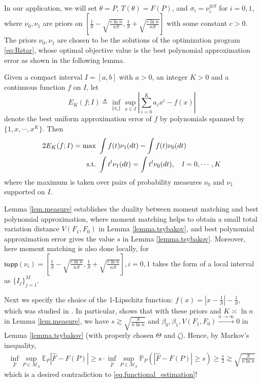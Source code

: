 \documentclass[final,12pt]{colt2018} %
\def \bP {\mathbb{P}}
\def \bE {\mathbb{E}}
\newcommand{\calM}{{\mathcal{M}}}
\begin{document}
In our application, we will set $\theta=P$, $T(\theta)=F(P)$, and $\sigma_i=\nu_i^{\otimes S}$ for $i=0,1$, where $\nu_0,\nu_1$ are priors on $[\frac{1}{S}-\sqrt{\frac{c\ln n}{nS}}, \frac{1}{S}+\sqrt{\frac{c\ln n}{nS}}]$ with some constant $c>0$. The priors $\nu_0,\nu_1$ are chosen to be the solutions of the optimization program \eqref{eq:Rstar}, whose optimal objective value is the best polynomial approximation error as shown in the following lemma.

\begin{lemma}\label{lem.measure}
	Given a compact interval $I=[a,b]$ with $a>0$, an integer $K>0$ and a continuous function $f$ on $I$, let 
	\[
	E_{K}(f;I) \triangleq \inf_{\{a_i\}} \sup_{x\in I} \left| \sum_{i=0}^K a_i x^i
	-f(x)\right| 
	\]
	denote the best uniform approximation error of $f$ by polynomials spanned by $\{1,x,\cdots,x^K\}$.
	Then
	\begin{equation}
	\begin{aligned}
	2 E_{K}(f;I) = \max & ~ \int f(t) \nu_1(dt) - \int f(t) \nu_0(dt)   \\
	\text{\rm s.t.}     & ~ \int t^{l} \nu_1(dt) = \int t^{l} \nu_0(dt), \quad l=0,\cdots,K
	\end{aligned}
	\label{eq:Rstar}
	\end{equation}
	where the maximum is taken over pairs of probability measures $\nu_0$ and $\nu_1$ supported on $I$.
\end{lemma}
Lemma \ref{lem.measure} establishes the duality between moment matching and best polynomial approximation, where moment matching helps to obtain a small total variation distance $V(F_1,F_0)$ in Lemma \ref{lemma.tsybakov}, and best polynomial approximation error gives the value $s$ in Lemma \ref{lemma.tsybakov}. Moreover, here moment matching is also done locally, for $\mathsf{supp}(\nu_i)=[\frac{1}{S}-\sqrt{\frac{c\ln n}{nS}}, \frac{1}{S}+\sqrt{\frac{c\ln n}{nS}}], i=0,1$ takes the form of a local interval as $\{I_j\}_{j=1}^M$. 

Next we specify the choice of the 1-Lipschitz function: $f(x)=|x-\frac{1}{S}|-\frac{1}{S}$, which was studied in \cite{jiao2017minimax}. In particular, \cite{jiao2017minimax} shows that with these priors and $K\asymp \ln n$ in Lemma \ref{lem.measure}, we have $s\gtrsim \sqrt{\frac{S}{n\ln n}}$ and $\beta_0, \beta_1, V(F_1,F_0)\overset{n\to\infty}{\to} 0$ in Lemma \ref{lemma.tsybakov} (with properly chosen $\Theta$ and $\zeta$). Hence, by Markov's inequality,
\begin{align*}
\inf_{\hat{F}} \sup_{P\in\calM_S} \bE_P |\hat{F}- F(P)| \ge s\cdot \inf_{\hat{F}} \sup_{P\in\calM_S} \bP_P \left(|\hat{F}- F(P)| \ge s\right) \ge \frac{s}{2} \gtrsim \sqrt{\frac{S}{n\ln n}}
\end{align*}
which is a desired contradiction to \eqref{eq.functional_estimation}!
\end{document}
